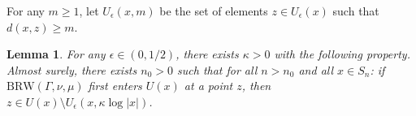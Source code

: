 \documentclass{amsart}
\newtheorem{lem}[thm]{Lemma}
\theoremstyle{definition}
\theoremstyle{remark}
\newcommand{\ywy}[1]{{\color{red}{#1}}}
\begin{document}

For any $m\ge 1$, let $U_{\epsilon}(x,m)$ be the set of elements  $z\in U_{\epsilon}(x)$ such that $d(x,z)\ge m$.

\begin{lem}\label{TraceAvoidTransBall}
For any $\epsilon\in (0,1/2)$, there exists $\kappa>0$ with the following property.
Almost  surely,   there exists $n_0>0$ such that  for all $n>n_0$ and all $x\in S_n$: if $\mathrm{BRW}(\Gamma,\nu,\mu)$ first enters $U(x)$ at a point $z$, then   $z\in U(x) \setminus U_{\epsilon}(x,\kappa \log |x|)$.  %



\end{lem}
 
\end{document}

